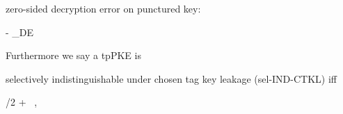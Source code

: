 \begin{definition}
\begin{sitemize}
        \item zero-sided decryption error on punctured key:
        \begin{bralign}
             - \alpha_{\textsf{DE}}\parr{\secpar}
        \end{bralign}
    \end{sitemize}
    Furthermore we say a tpPKE is
    \begin{sitemize}
        \item selectively indistinguishable under chosen tag key leakage (sel-IND-CTKL) iff
        \begin{bralign}
            /2 + \varepsilon\parr{\secpar}
            \ ,
        \end{bralign}


\end{sitemize}
\end{definition}
